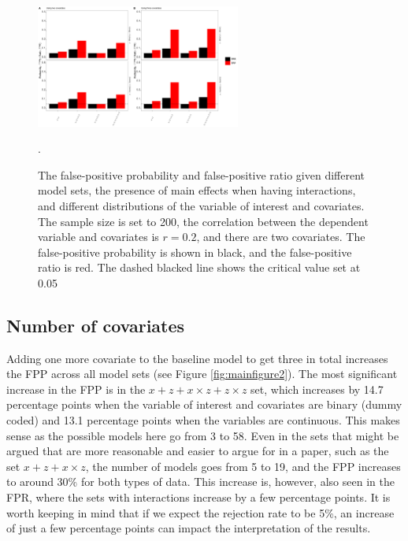 \begin{figure}[hbt!]
\includegraphics[width=0.6\textwidth]{R/Analysis/Result/Figures/Figure1_paper.jpeg}
\centering
\caption{The false-positive probability and false-positive ratio given different model sets, the presence of main effects when having interactions, and different distributions of the variable of interest and covariates. The sample size is set to 200, the correlation between the dependent variable and covariates is $r=0.2$, and there are two covariates. The false-positive probability is shown in black, and the false-positive ratio is red. The dashed blacked line shows the critical value set at 0.05 }.
\label{fig:mainfigure1}
\end{figure}

\subsection{Number of covariates}
Adding one more covariate to the baseline model to get three in total increases the FPP across all model sets (see Figure \ref{fig:mainfigure2}).  The most significant increase in the FPP is in the $x + z+ x \times z + z \times z$ set, which increases by 14.7 percentage points when the variable of interest and covariates are binary (dummy coded) and 13.1 percentage points when the variables are continuous. This makes sense as the possible models here go from 3 to 58. Even in the sets that might be argued that are more reasonable and easier to argue for in a paper, such as the set $x + z+ x \times z $, the number of models goes from 5 to 19, and the FPP increases to around 30\% for both types of data. This increase is, however, also seen in the FPR, where the sets with interactions increase by a few percentage points. It is worth keeping in mind that if we expect the rejection rate to be 5\%, an increase of just a few percentage points can impact the interpretation of the results.  



